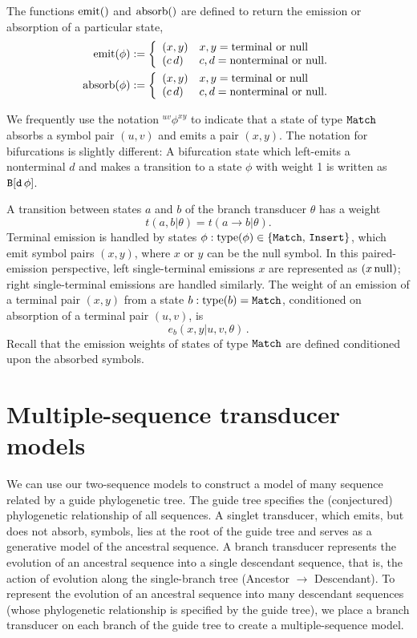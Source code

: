 \documentclass[10pt]{article}
\begin{document}
The functions $\operatorname{emit}()$ and $\operatorname{absorb}()$ are defined to return the emission or absorption of a particular state,
\begin{align*}
  \operatorname{emit}(\phi) &:= \left\{\begin{array}{ll} (x,y) & x,y = \mathrm{terminal\,\,or\,\,null} \\(c\,d) & c,d = \mathrm{nonterminal\,\,or\,\,null}. \end{array} \right. \\
  \operatorname{absorb}(\phi) &:= \left\{\begin{array}{ll} (x,y) & x,y = \mathrm{terminal\,\,or\,\,null} \\(c\,d) & c,d = \mathrm{nonterminal\,\,or\,\,null}. \end{array} \right.
\end{align*}

We frequently use the notation ${}^{uv}\phi^{xy}$ to indicate that a state of type $\mathtt{Match}$ absorbs a symbol pair $(u,v)$
and emits a pair $(x,y)$.
The notation for bifurcations is slightly different:
A bifurcation state which left-emits a nonterminal $d$ and makes a transition to a state $\phi$ with weight 1 is written as $\mathtt{B[d\,\phi]}$.

A transition between states $a$ and $b$ of the branch transducer $\theta$ has a weight
\[ t(a,b|\theta) = t(a \to b|\theta). \]
Terminal emission is handled by states $\phi: \operatorname{type}(\phi) \in \{\mathtt{Match},\,\mathtt{Insert}\}$, which emit symbol pairs $(x,y)$,
where $x$ or $y$ can be the null symbol.
In this paired-emission perspective, left single-terminal emissions $x$ are represented as $(x\,\mathrm{null})$;
right single-terminal emissions are handled similarly.
The weight of an emission of a terminal pair $(x,y)$ from a state $b: \operatorname{type}(b) = \mathtt{Match}$, 
conditioned on absorption of a terminal pair $(u,v)$, is 
\[ e_b ( x,y|u,v,\theta ) \, . \]
Recall that the emission weights of states of type $\mathtt{Match}$ are defined conditioned upon the absorbed symbols.


\newpage
\section{Multiple-sequence transducer models} 

We can use our two-sequence models to construct a model of many sequence related by a
guide phylogenetic tree.
The guide tree specifies the (conjectured) phylogenetic relationship of all sequences.
A singlet transducer, which emits, but does not absorb, symbols, lies at the root of the guide tree and 
serves as a generative model of the ancestral sequence.
A branch transducer represents the evolution of an ancestral sequence into a single descendant 
sequence, that is, the action of evolution along the single-branch tree (Ancestor $\to$ Descendant).
To represent the evolution of an ancestral sequence into many descendant sequences
(whose phylogenetic relationship is specified by the guide tree),
we place a branch transducer on each branch of the guide tree to create a multiple-sequence model.
\end{document}
